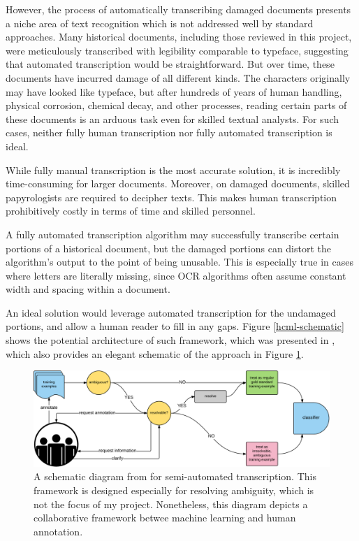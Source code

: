 \documentclass[final]{ukthesis}
\begin{document}
However, the process of automatically transcribing damaged documents presents a niche area of text recognition which is not addressed well by standard approaches. Many historical documents, including those reviewed in this project, were meticulously transcribed with legibility comparable to typeface, suggesting that automated transcription would be straightforward. But over time, these documents have incurred damage of all different kinds. The characters originally may have looked like typeface, but after hundreds of years of human handling, physical corrosion, chemical decay, and other processes, reading certain parts of these documents is an arduous task even for skilled textual analysts. For such cases, neither fully human transcription nor fully automated transcription is ideal.

While fully manual transcription is the most accurate solution, it is incredibly time-consuming for larger documents. Moreover, on damaged documents, skilled papyrologists are required to decipher texts. This makes human transcription prohibitively costly in terms of time and skilled personnel.

A fully automated transcription algorithm may successfully transcribe certain portions of a historical document, but the damaged portions can distort the algorithm's output to the point of being unusable. This is especially true in cases where letters are literally missing, since OCR algorithms often assume constant width and spacing within a document.

An ideal solution would leverage automated transcription for the undamaged portions, and allow a human reader to fill in any gaps. Figure \ref{hcml-schematic} shows the potential architecture of such framework, which was presented in \cite{schaekermann2016resolvable}, which also provides an elegant schematic of the approach in Figure \ref{fig:hcml-schematic}.


\begin{figure}[t]
\begin{center}
\includegraphics[width=14cm]{hcml-schematic}
\end{center}
\caption{A schematic diagram from \cite{schaekermann2016resolvable} for semi-automated transcription. This  framework is designed especially for resolving ambiguity, which is not the focus of my project. Nonetheless, this diagram depicts a collaborative framework betwee machine learning and human annotation.}
\label{fig:hcml-schematic}
\end{figure}
\end{document}
